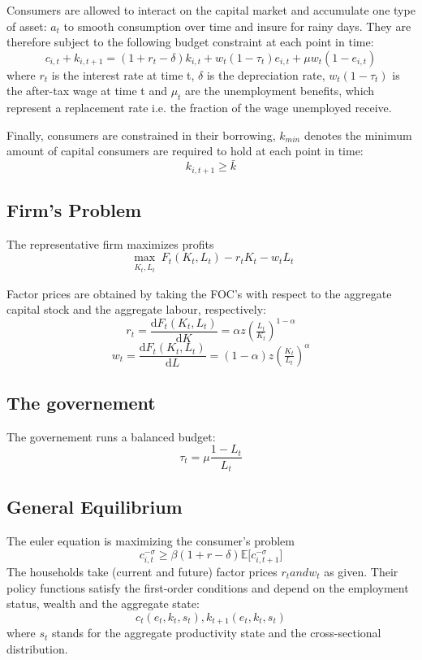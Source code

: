 \documentclass[a4paper,12pt]{article}
\begin{document}
Consumers are allowed to interact on the capital market and accumulate one type of asset: $a_{t}$ to smooth consumption over time and insure for rainy days. They are therefore subject to the following budget constraint at each point in time: 
  \[ 
  c_{i,t} + k_{i,t+1} = (1 + r_{t} - \delta) k_{i,t} + w_{t} (1 - \tau_{t})  e_{i,t} + \mu w_{t} (1 - e_{i,t})
  \]
 where $r_{t}$ is the interest rate at time t, $\delta$ is the depreciation rate, $w_{t}(1-\tau_{t})$ is the after-tax wage at time t and $\mu_{t}$ are the unemployment benefits, which represent a replacement rate i.e. the fraction of the wage unemployed receive. 
  
Finally, consumers are constrained in their borrowing, $k_{min}$ denotes the minimum amount of capital consumers are required to hold at each point in time: 
   \[
   k_{i,t + 1} \geq \bar{k}
 	\]
	
\subsection{Firm's Problem}

The representative firm maximizes profits 
\[ \max_{\substack{K_{t},L_{t}}}F_{t}(K_{t},L_{t})-r_{t}K_{t}-w_{t}L_{t}
\]

Factor prices are obtained by taking the FOC's with respect to the aggregate capital stock and the aggregate labour, respectively: 
\[
r_{t} = \frac{\mathrm d F_{t}(K_{t},L_{t})}{\mathrm d K} = \alpha z (\tfrac{L_{t}}{K_{t}})^{1-\alpha} \]
\[
w_{t} = \frac{\mathrm d F_{t}(K_{t},L_{t})}{\mathrm d L} =(1-\alpha)z (\tfrac{K_{t}}{L_{t}})^{\alpha}
\]

\subsection{The governement}

The governement runs a balanced budget:
\[
\tau_{t}=\mu\frac{1-L_{t}}{L_{t}}
\]

\subsection{General Equilibrium}

The euler equation is maximizing the consumer's problem
\[ 
c_{i,t}^{- \sigma} \geq \beta (1+r -\delta){\mathbb{E}[c_{i,t+1}^{- \sigma}}]
\]
The households take (current and future) factor prices $r_{t} and w_{t}$ as given. Their policy functions satisfy the first-order conditions and depend on the employment status, wealth and the aggregate state: 
\[ c_{t}(e_{t},k_{t},s_{t}), k_{t+1}(e_{t},k_{t},s_{t})
\]
where $s_{t}$ stands for the aggregate productivity state and the cross-sectional distribution. 
\end{document}
